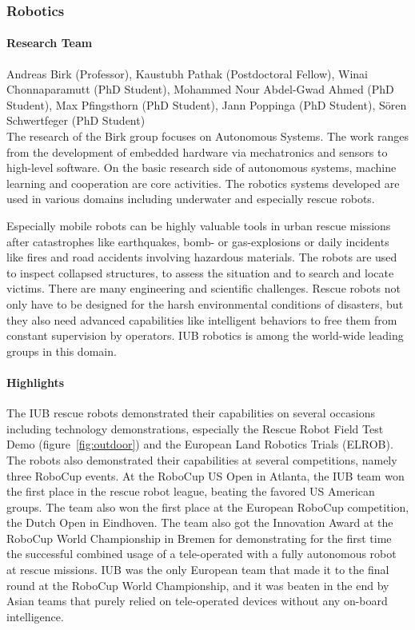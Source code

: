 \subsubsection{Robotics}\label{ict:robotics:birk}

\paragraph{Research Team}
Andreas Birk (Professor),
Kaustubh Pathak (Postdoctoral Fellow),
Winai Chonnaparamutt (PhD Student),
Mohammed Nour Abdel-Gwad Ahmed (PhD Student),
Max Pfingsthorn (PhD Student),
Jann Poppinga (PhD Student),
S\"{o}ren Schwertfeger (PhD Student) \\

The research of the Birk group focuses on Autonomous Systems. The work ranges from the
development of embedded hardware via mechatronics and sensors to high-level software. On
the basic research side of autonomous systems, machine learning and cooperation are core
activities. The robotics systems developed are used in various domains including
underwater and especially rescue robots.

 Especially mobile robots can be highly valuable tools in urban rescue
missions after catastrophes like earthquakes, bomb- or gas-explosions or daily incidents
like fires and road accidents involving hazardous materials. The robots are used to
inspect collapsed structures, to assess the situation and to search and locate
victims. There are many engineering and scientific challenges. Rescue robots not only have
to be designed for the harsh environmental conditions of disasters, but they also need
advanced capabilities like intelligent behaviors to free them from constant supervision by
operators.  IUB robotics is among the world-wide leading groups in this domain.

\paragraph{Highlights}

The IUB rescue robots demonstrated their capabilities on several
occasions including technology demonstrations, especially the Rescue
Robot Field Test Demo (figure~\ref{fig:outdoor}) and the European
Land Robotics Trials (ELROB). The robots also demonstrated their
capabilities at several competitions, namely three RoboCup events.
At the RoboCup US Open in Atlanta, the IUB team won the first place
in the rescue robot league, beating the favored US American groups.
The team also won the first place at the European RoboCup
competition, the Dutch Open in Eindhoven. The team also got the
Innovation Award at the RoboCup World Championship in Bremen for
demonstrating for the first time the successful combined usage of a
tele-operated with a fully autonomous robot at rescue missions. IUB
was the only European team that made it to the final round at the
RoboCup World Championship, and it was beaten in the end by Asian
teams that purely relied on tele-operated devices without any
on-board intelligence.



